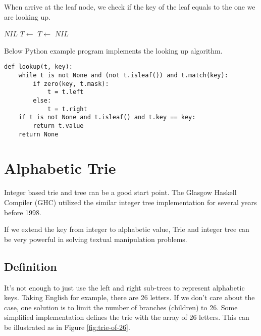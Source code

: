 \documentclass[b5paper]{article}
\begin{document}
When arrive at the leaf node, we check if the key of the
leaf equals to the one we are looking up.

\begin{algorithmic}[1]
    \State \Return $NIL$ 
  \EndIf
      \State $T \gets$ 
    \Else
      \State $T \gets$ 
    \EndIf
  \EndWhile
    \State \Return {}
  \Else
    \State \Return $NIL$ 
  \EndIf
\EndFunction
\end{algorithmic}

Below Python example program implements the looking up algorithm.

\lstset{language=Python}
\begin{lstlisting}
def lookup(t, key):
    while t is not None and (not t.isleaf()) and t.match(key):
        if zero(key, t.mask):
            t = t.left
        else:
            t = t.right
    if t is not None and t.isleaf() and t.key == key:
        return t.value
    return None
\end{lstlisting}


\section{Alphabetic Trie}
Integer based trie and tree can be a good start point. The
Glasgow Haskell Compiler (GHC) utilized the similar integer tree
implementation for several years before 1998\cite{okasaki-int-map}.

If we extend the key from integer to alphabetic
value, Trie and integer tree can be very powerful in solving
textual manipulation problems.

\subsection{Definition}
It's not enough to just use the left and right sub-trees to represent
alphabetic keys. Taking English for example, there are 26 letters.
If we don't care about the case, one solution is to limit the number
of branches (children) to 26. Some simplified implementation defines
the trie with the array of 26 letters.
This can be illustrated as in Figure \ref{fig:trie-of-26}.
\end{document}
